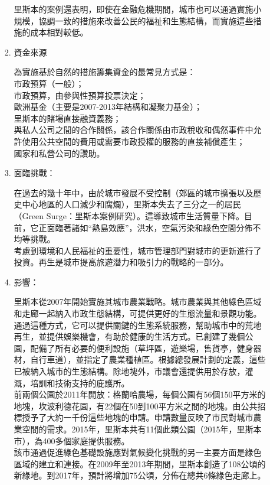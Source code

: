 \documentclass[a4paper,12pt]{article}
\begin{document}
\begin{enumerate}
\begin{enumerate}
\begin{enumerate}
里斯本的案例還表明，即使在金融危機期間，城市也可以通過實施小規模，協調一致的措施來改善公民的福祉和生態結構，而實施這些措施的成本相對較低。\\
\item 資金來源
\label{sec:org9492c0b}

為實施基於自然的措施籌集資金的最常見方式是：\\

市政預算（一般）；\\
市政預算，由參與性預算投票決定；\\
歐洲基金（主要是2007-2013年結構和凝聚力基金）；\\
里斯本的賭場直接融資義務；\\
與私人公司之間的合作關係，該合作關係由市政稅收和偶然事件中允許使用公共空間的費用或需要市政授權的服務的直接補償產生；\\
國家和私營公司的讚助。\\
\item 面臨挑戰：
\label{sec:org7ad2906}

在過去的幾十年中，由於城市發展不受控制（郊區的城市擴張以及歷史中心地區的人口減少和腐爛），里斯本失去了三分之一的居民（Green Surge：里斯本案例研究）。這導致城市生活質量下降。目前，它正面臨著諸如“熱島效應”，洪水，空氣污染和綠色空間分佈不均等挑戰。\\

考慮到環境和人民福祉的重要性，城市管理部門對城市的更新進行了投資。再生是城市提高旅遊潛力和吸引力的戰略的一部分。\\
\item 影響：
\label{sec:org11e3f22}

里斯本從2007年開始實施其城市農業戰略。城市農業與其他綠色區域和走廊一起納入市政生態結構，可提供更好的生態流量和景觀功能。通過這種方式，它可以提供關鍵的生態系統服務，幫助城市中的荒地再生，並提供娛樂機會，有助於健康的生活方式。已創建了幾個公園，配備了所有必要的便利設施（草坪區，遊樂場，售貨亭，健身器材，自行車道），並指定了農業種植區。根據總發展計劃的定義，這些已被納入城市的生態結構。除地塊外，市議會還提供用於存放，灌溉，培訓和技術支持的庇護所。\\

前兩個公園於2011年開放：格蘭哈農場，每個公園有56個150平方米的地塊，坎波利德花園，有22個在50到100平方米之間的地塊。由公共招標授予了大約一千份這些地塊的申請。申請數量反映了市民對城市農業空間的需求。2015年，里斯本共有11個此類公園（2015年，里斯本市），為400多個家庭提供服務。\\

該市通過促進綠色基礎設施應對氣候變化挑戰的另一主要方面是綠色區域的建立和連接。在2009年至2013年期間，里斯本創造了108公頃的新綠地。到2017年，預計將增加75公頃，分佈在總共6條綠色走廊上。\\


\end{enumerate}
\end{enumerate}
\end{enumerate}
\end{document}
